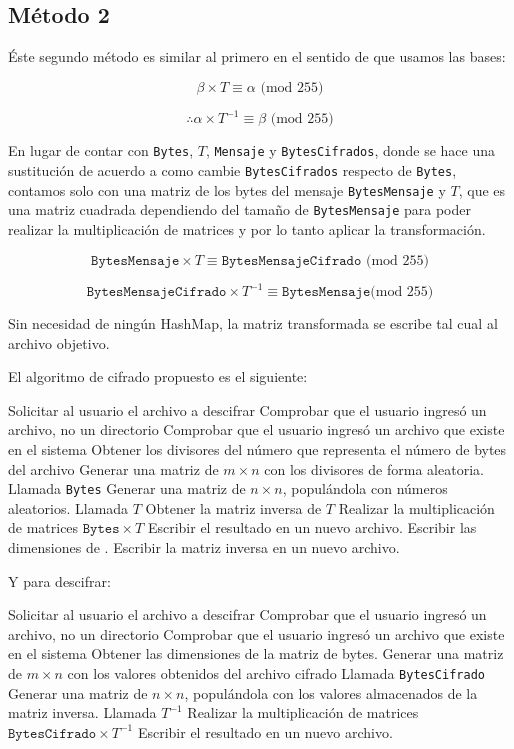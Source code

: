 \documentclass[a4paper]{article}
\begin{document}
\subsection{Método 2}

Éste segundo método es similar al primero en el sentido de que usamos las
bases:


\[
\beta \times T \equiv \alpha \text{ (mod 255)}
\]

\[
\therefore \alpha \times T^{-1} \equiv \beta \text{ (mod 255)}
\]

En lugar de contar con \texttt{Bytes}, $T$, \texttt{Mensaje}
y \texttt{BytesCifrados}, donde se hace una sustitución de acuerdo a como
cambie \texttt{BytesCifrados} respecto de \texttt{Bytes}, contamos solo con
una matriz de los bytes del mensaje \texttt{BytesMensaje} y $T$, que es una
matriz cuadrada dependiendo del tamaño de \texttt{BytesMensaje} para poder
realizar la multiplicación de matrices y por lo tanto aplicar la
transformación.

\[
\texttt{BytesMensaje} \times T \equiv \texttt{BytesMensajeCifrado}
\text{ (mod 255)}
\]

\[
\texttt{BytesMensajeCifrado} \times T^{-1} \equiv \texttt{BytesMensaje} \text{
(mod
255)}
\]

Sin necesidad de ningún HashMap, la matriz transformada se escribe tal cual al
archivo objetivo.

El algoritmo de cifrado propuesto es el siguiente:

\begin{outline}[enumerate]
    \1 Solicitar al usuario el archivo a descifrar
    \1 Comprobar que el usuario ingresó un archivo, no un directorio
    \1 Comprobar que el usuario ingresó un archivo que existe en el sistema
    \1 Obtener los divisores del número que representa el número de bytes del
archivo
    \1 Generar una matriz de $m\times n$ con los divisores de forma aleatoria.
Llamada \texttt{Bytes}
    \1 Generar una matriz de $n\times n$, populándola con números aleatorios.
Llamada $T$
    \1 Obtener la matriz inversa de $T$
    \1 Realizar la multiplicación de matrices $\texttt{Bytes} \times T$
    \1 Escribir el resultado en un nuevo archivo.
    \1 Escribir las dimensiones de .
    \1 Escribir la matriz inversa en un nuevo archivo.
\end{outline}

Y para descifrar:

\begin{outline}[enumerate]
    \1 Solicitar al usuario el archivo a descifrar
    \1 Comprobar que el usuario ingresó un archivo, no un directorio
    \1 Comprobar que el usuario ingresó un archivo que existe en el sistema
    \1 Obtener las dimensiones de la matriz de bytes.
    \1 Generar una matriz de $m\times n$ con los valores obtenidos del archivo
cifrado Llamada \texttt{BytesCifrado}
    \1 Generar una matriz de $n\times n$, populándola con los valores
almacenados de la matriz inversa.
Llamada $T^{-1}$
    \1 Realizar la multiplicación de matrices $\texttt{BytesCifrado} \times
T^{-1}$
    \1 Escribir el resultado en un nuevo archivo.
\end{outline}
\end{document}
